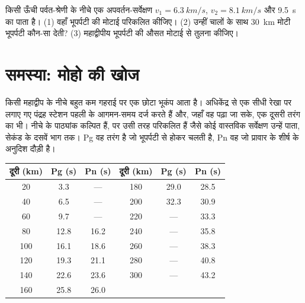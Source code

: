\begin{exercise}[$\star\star\star$]\label{exo:g11:seismic-structure:15}
किसी ऊँची पर्वत-श्रेणी के नीचे एक अपवर्तन-सर्वेक्षण $v_1 =
\qty{6.3}{km/s}$, $v_2 = \qty{8.1}{km/s}$ और \qty{9.5}{s} का 
पाता है। (1) वहाँ भूपर्पटी की मोटाई परिकलित कीजिए। (2) उन्हीं चालों के साथ \qty{30}{km} मोटी
भूपर्पटी कौन-सा  देती?
(3) महाद्वीपीय भूपर्पटी की औसत मोटाई से तुलना कीजिए।
\end{exercise}

\section{समस्या: मोहो की खोज}

\begin{problem}
\label{pb:g11:seismic-structure:1}
किसी महाद्वीप के नीचे बहुत कम गहराई पर एक छोटा भूकंप आता है।
अधिकेंद्र से एक सीधी रेखा पर लगाए गए पंद्रह स्टेशन पहली  के
आगमन-समय दर्ज करते हैं और, जहाँ वह पढ़ा जा सके, एक दूसरी तरंग का भी। नीचे के
पाठ्यांक कल्पित हैं, पर उसी तरह परिकलित हैं जैसे कोई वास्तविक सर्वेक्षण
उन्हें पाता, सेकंड के दसवें भाग तक। Pg वह तरंग है जो
भूपर्पटी से होकर चलती है, Pn वह जो प्रावार के शीर्ष के अनुदिश दौड़ी है।

\begin{center}
\small
\begin{tabular}{|c|c|c||c|c|c|}
\hline
दूरी (\unit{km}) & Pg (\unit{s}) & Pn (\unit{s}) & दूरी (\unit{km}) & Pg (\unit{s}) & Pn (\unit{s}) \\ \hline
20 & 3.3 & --- & 180 & 29.0 & 28.5 \\ \hline
40 & 6.5 & --- & 200 & 32.3 & 30.9 \\ \hline
60 & 9.7 & --- & 220 & --- & 33.3 \\ \hline
80 & 12.8 & 16.2 & 240 & --- & 35.8 \\ \hline
100 & 16.1 & 18.6 & 260 & --- & 38.3 \\ \hline
120 & 19.3 & 21.1 & 280 & --- & 40.8 \\ \hline
140 & 22.6 & 23.6 & 300 & --- & 43.2 \\ \hline
160 & 25.8 & 26.0 & & & \\ \hline
\end{tabular}
\end{center}


\end{problem}

